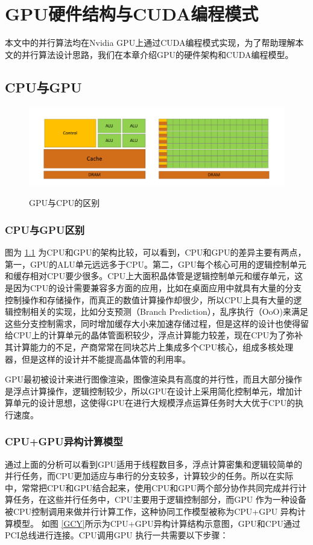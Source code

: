 \chapter{GPU硬件结构与CUDA编程模式}
本文中的并行算法均在Nvidia GPU上通过CUDA编程模式实现，为了帮助理解本文的并行算法设计思路，我们在本章介绍GPU的硬件架构和CUDA编程模型。
\section{CPU与GPU}
\begin{figure}
\setlength{\abovecaptionskip}{-0.5cm}
\begin{center}
{\includegraphics[width=1 \textwidth]{figures/GPU&CPU.pdf}}
\end{center}
\caption{{\footnotesize{GPU与CPU的区别}}}
\label{GCD}
\end{figure}
\subsection{CPU与GPU区别}

图为 \ref{GCD} 为CPU和GPU的架构比较，可以看到，CPU和GPU的差异主要有两点，第一，GPU的ALU单元远远多于CPU。第二，GPU每个核心可用的逻辑控制单元和缓存相对CPU要少很多。CPU上大面积晶体管是逻辑控制单元和缓存单元，这是因为CPU的设计需要兼容多方面的应用，比如在桌面应用中就具有大量的分支控制操作和存储操作，而真正的数值计算操作却很少，所以CPU上具有大量的逻辑控制相关的实现，比如分支预测（Branch Prediction），乱序执行（OoO)来满足这些分支控制需求，同时增加缓存大小来加速存储过程，但是这样的设计也使得留给CPU上的计算单元的晶体管面积较少，浮点计算能力较差，现在CPU为了弥补其计算能力的不足，产商常常在同块芯片上集成多个CPU核心，组成多核处理器，但是这样的设计并不能提高晶体管的利用率。

GPU最初被设计来进行图像渲染，图像渲染具有高度的并行性，而且大部分操作是浮点计算操作，逻辑控制较少，所以GPU在设计上采用简化控制单元，增加计算单元的设计思想，这使得GPU在进行大规模浮点运算任务时大大优于CPU的执行速度。
\subsection{CPU+GPU异构计算模型}
通过上面的分析可以看到GPU适用于线程数目多，浮点计算密集和逻辑较简单的并行任务，而CPU更加适应与串行的分支较多，计算较少的任务。所以在实际中，常常把CPU和GPU结合起来，使用CPU和GPU两个部分协作共同完成并行计算任务，在这些并行任务中，CPU主要用于逻辑控制部分，而GPU 作为一种设备被CPU控制调用来做并行计算工作，这种协同工作模型被称为CPU+GPU 异构计算模型。
如图 \ref{GCY}所示为CPU+GPU异构计算结构示意图，GPU和CPU通过PCI总线进行连接。CPU调用GPU 执行一共需要以下步骤：

